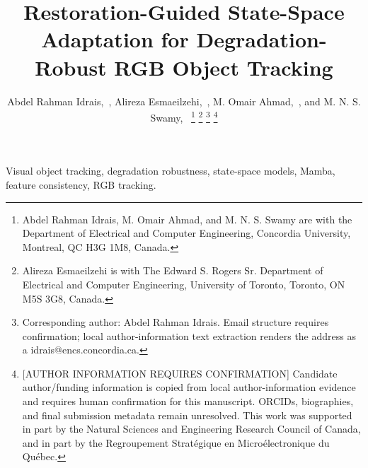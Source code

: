 \documentclass[journal]{IEEEtran}
\title{Restoration-Guided State-Space Adaptation for Degradation-Robust RGB Object Tracking}
\author{Abdel Rahman Idrais,~\IEEEmembership{Student Member,~IEEE},
Alireza Esmaeilzehi,~\IEEEmembership{Member,~IEEE},
M. Omair Ahmad,~\IEEEmembership{Fellow,~IEEE}, and
M. N. S. Swamy,~\IEEEmembership{Fellow,~IEEE}%
\thanks{Abdel Rahman Idrais, M. Omair Ahmad, and M. N. S. Swamy are with the Department of Electrical and Computer Engineering, Concordia University, Montreal, QC H3G 1M8, Canada.}%
\thanks{Alireza Esmaeilzehi is with The Edward S. Rogers Sr. Department of Electrical and Computer Engineering, University of Toronto, Toronto, ON M5S 3G8, Canada.}%
\thanks{Corresponding author: Abdel Rahman Idrais. Email structure requires confirmation; local author-information text extraction renders the address as a idrais@encs.concordia.ca.}%
\thanks{[AUTHOR INFORMATION REQUIRES CONFIRMATION] Candidate author/funding information is copied from local author-information evidence and requires human confirmation for this manuscript. ORCIDs, biographies, and final submission metadata remain unresolved. This work was supported in part by the Natural Sciences and Engineering Research Council of Canada, and in part by the Regroupement Strat\'egique en Micro\'electronique du Qu\'ebec.}}
\begin{document}
\maketitle



\begin{IEEEkeywords}
Visual object tracking, degradation robustness, state-space models, Mamba, feature consistency, RGB tracking.
\end{IEEEkeywords}












\end{document}
